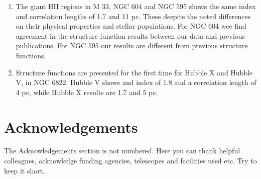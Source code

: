 \documentclass[fleqn,usenatbib]{mnras}
\begin{document}
\begin{enumerate}
    \item The giant HII regions in  M 33, NGC 604 and NGC 595 shows the same index and correlation lengths of 1.7 and 11 pc. These despite the noted differences on their physical properties and stellar populations. For NGC 604 wee find agreement in the structure function results between our data and previous publications. For NGC 595 our results are different from previous structure functions.
    
    \item Structure functions are presented for the first time for Hubble X and Hubble V, in NGC 6822. Hubble V shows and index of 1.8 and a correlation length of 4 pc, while Hubble X results are 1.7 and 5 pc.
    
\end{enumerate}


\section*{Acknowledgements}

The Acknowledgements section is not numbered. Here you can thank helpful
colleagues, acknowledge funding agencies, telescopes and facilities used etc.
Try to keep it short.






\bsp	%
\label{lastpage}
\end{document}
